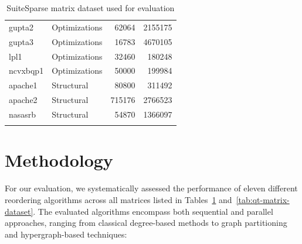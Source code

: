 \begin{longtable}{|l|l|r|r|}
gupta2 & Optimizations & 62064 & 2155175 \\
gupta3 & Optimizations & 16783 & 4670105 \\
lpl1 & Optimizations & 32460 & 180248 \\
ncvxbqp1 & Optimizations & 50000 & 199984 \\
apache1 & Structural & 80800 & 311492 \\
apache2 & Structural & 715176 & 2766523 \\
nasasrb & Structural & 54870 & 1366097 \\
\caption{SuiteSparse matrix dataset used for evaluation}
\label{tab:matrix-dataset}
\end{longtable}

\begin{table}[h]
\centering
\caption{Quantum Transport matrix dataset used for evaluation}
\label{tab:qt-matrix-dataset}
\end{table}

\section{Methodology}

For our evaluation, we systematically assessed the performance of eleven different reordering algorithms across all matrices listed in Tables~\ref{tab:matrix-dataset} and~\ref{tab:qt-matrix-dataset}. The evaluated algorithms encompass both sequential and parallel approaches, ranging from classical degree-based methods to graph partitioning and hypergraph-based techniques:

